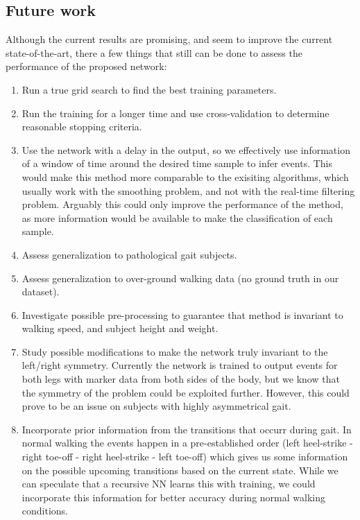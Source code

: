 \documentclass{acm_proc_article-sp}
\begin{document}
\subsection{Future work}
Although the current results are promising, and seem to improve the current state-of-the-art, there a few things that still can be done to assess the performance of the proposed network:
\begin{enumerate}
 \item Run a true grid search to find the best training parameters.
 \item Run the training for a longer time and use cross-validation to determine reasonable stopping criteria.
 \item Use the network with a delay in the output, so we effectively use information of a window of time around the desired time sample to infer events. This would make this method more comparable to the exisiting algorithms, which usually work with the smoothing problem, and not with the real-time filtering problem. Arguably this could only improve the performance of the method, as more information would be available to make the classification of each sample.
 \item Assess generalization to pathological gait subjects.
 \item Assess generalization to over-ground walking data (no ground truth in our dataset).
 \item Investigate possible pre-processing to guarantee that method is invariant to walking speed, and subject height and weight.
 \item Study possible modifications to make the network truly invariant to the left/right symmetry. Currently the network is trained to output events for both legs with marker data from both sides of the body, but we know that the symmetry of the problem could be exploited further. However, this could prove to be an issue on subjects with highly asymmetrical gait.
 \item Incorporate prior information from the transitions that occurr during gait. In normal walking the events happen in a pre-established order (left heel-strike - right toe-off - right heel-strike - left toe-off) which gives us some information on the possible upcoming transitions based on the current state. While we can speculate that a recursive NN learns this with training, we could incorporate this information for better accuracy during normal walking conditions.
\end{enumerate}
\end{document}
